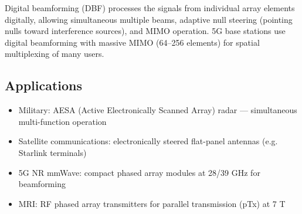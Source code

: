 				

Digital beamforming (DBF) processes the signals from individual array elements digitally, allowing simultaneous multiple beams, adaptive null steering (pointing nulls toward interference sources), and MIMO operation. 5G base stations use digital beamforming with massive MIMO (64–256 elements) for spatial multiplexing of many users.

				

\subsection{Applications}

				
\begin{itemize}

					\item Military: AESA (Active Electronically Scanned Array) radar — simultaneous multi-function operation

					\item Satellite communications: electronically steered flat-panel antennas (e.g. Starlink terminals)

					\item 5G NR mmWave: compact phased array modules at 28/39 GHz for beamforming

					\item MRI: RF phased array transmitters for parallel transmission (pTx) at 7 T

				
\end{itemize}




